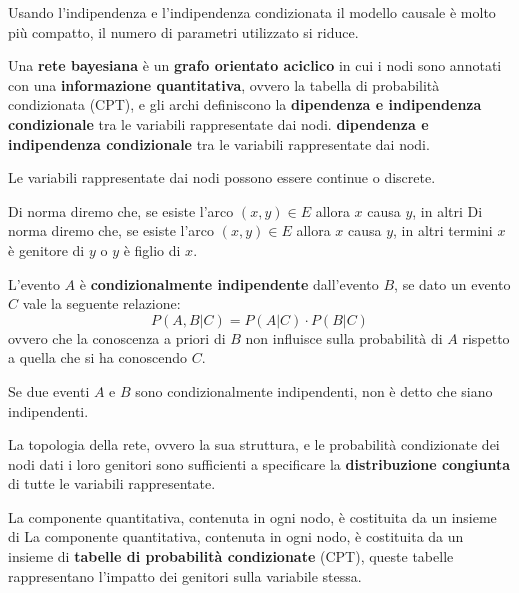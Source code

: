 Usando l'indipendenza e l'indipendenza condizionata il modello causale è molto
più compatto, il numero di parametri utilizzato si riduce.
\begin{definizione}
    Una \textbf{rete bayesiana} è un \textbf{grafo orientato aciclico} in cui i
    nodi sono annotati con una \textbf{informazione quantitativa}, ovvero la
    tabella di probabilità condizionata (CPT), e gli archi definiscono la
    \textbf{dipendenza e indipendenza condizionale} tra le variabili
    rappresentate dai nodi.
    \textbf{dipendenza e indipendenza condizionale} tra le variabili
    rappresentate dai nodi.
\end{definizione}
\begin{nota}
    Le variabili rappresentate dai nodi possono essere continue o discrete.
\end{nota}
Di norma diremo che, se esiste l'arco $(x,y)\in E$ allora $x$ causa $y$, in altri
Di norma diremo che, se esiste l'arco $(x,y)\in E$ allora $x$ causa $y$, in altri
termini $x$ è genitore di $y$ o $y$ è figlio di $x$.
\begin{center}
\end{center}
\begin{definizione}
    L'evento $A$ è \textbf{condizionalmente indipendente} dall'evento $B$, se dato
    un evento $C$ vale la seguente relazione:
    \begin{equation}
        P(A, B | C) = P(A|C) \cdot P(B | C)
    \end{equation}
    ovvero che la conoscenza a priori di $B$ non influisce sulla probabilità di
    $A$ rispetto a quella che si ha conoscendo $C$.
\end{definizione}
\begin{nota}
    Se due eventi $A$ e $B$ sono condizionalmente indipendenti, non è detto che
    siano indipendenti.
\end{nota}
La topologia della rete, ovvero la sua struttura, e le probabilità condizionate
dei nodi dati i loro genitori sono sufficienti a specificare la \textbf{distribuzione
    congiunta} di tutte le variabili rappresentate.

La componente quantitativa, contenuta in ogni nodo, è costituita da un insieme di
La componente quantitativa, contenuta in ogni nodo, è costituita da un insieme di
\textbf{tabelle di probabilità condizionate} (CPT), queste tabelle rappresentano
l'impatto dei genitori sulla variabile stessa.


